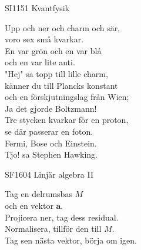 \documentclass[a6paper, 10pt, twoside]{article}
\begin{document}
\noindent
\begin{center}
\footnotesize SI1151 Kvantfysik\\
\end{center}
\begin{lyrics}
Upp och ner och charm och sär, \\
voro sex små kvarkar. \\
En var grön och en var blå \\
och en var lite anti. 
\vspace{5pt} \\
"Hej" sa topp till lille charm, \\
känner du till Plancks konstant \\
och en förskjutningslag från Wien; \\
Ja det gjorde Boltzmann! 
\vspace{5pt} \\
Tre stycken kvarkar för en proton, \\
se där passerar en foton. \\
Fermi, Bose och Einstein. \\
Tjo! sa Stephen Hawking. 
\end{lyrics}
\begin{center}
\footnotesize SF1604 Linjär algebra II\\
\end{center}
\begin{lyrics}
Tag en delrumsbas $M$\\
och en vektor $\boldsymbol{a}$.\\
Projicera ner, tag dess residual.\\
Normalisera, tillför den till $M$.\\
Tag sen nästa vektor, börja om igen.
\end{lyrics}



\noindent
\end{document}
